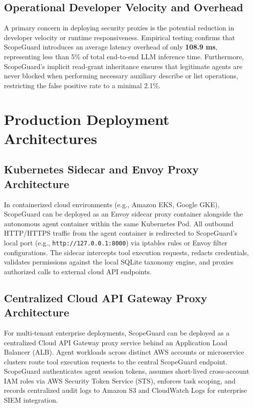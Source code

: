 \documentclass[conference]{IEEEtran}
\begin{document}
\subsection{Operational Developer Velocity and Overhead}
A primary concern in deploying security proxies is the potential reduction in developer velocity or runtime responsiveness. Empirical testing confirms that ScopeGuard introduces an average latency overhead of only \textbf{108.9 ms}, representing less than 5\% of total end-to-end LLM inference time. Furthermore, ScopeGuard's implicit read-grant inheritance ensures that legitimate agents are never blocked when performing necessary auxiliary describe or list operations, restricting the false positive rate to a minimal 2.1\%.

\section{Production Deployment Architectures}\label{sec:production}

\subsection{Kubernetes Sidecar and Envoy Proxy Architecture}
In containerized cloud environments (e.g., Amazon EKS, Google GKE), ScopeGuard can be deployed as an Envoy sidecar proxy container alongside the autonomous agent container within the same Kubernetes Pod. All outbound HTTP/HTTPS traffic from the agent container is redirected to ScopeGuard's local port (e.g., \texttt{http://127.0.0.1:8000}) via iptables rules or Envoy filter configurations. The sidecar intercepts tool execution requests, redacts credentials, validates permissions against the local SQLite taxonomy engine, and proxies authorized calls to external cloud API endpoints.

\subsection{Centralized Cloud API Gateway Proxy Architecture}
For multi-tenant enterprise deployments, ScopeGuard can be deployed as a centralized Cloud API Gateway proxy service behind an Application Load Balancer (ALB). Agent workloads across distinct AWS accounts or microservice clusters route tool execution requests to the central ScopeGuard endpoint. ScopeGuard authenticates agent session tokens, assumes short-lived cross-account IAM roles via AWS Security Token Service (STS), enforces task scoping, and records centralized audit logs to Amazon S3 and CloudWatch Logs for enterprise SIEM integration.
\end{document}
